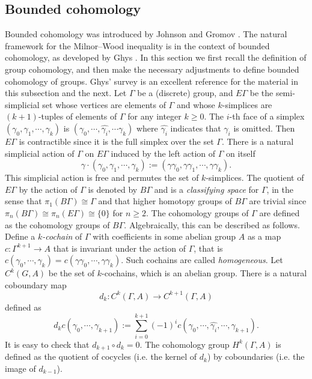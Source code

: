 \documentclass[11pt]{amsart}
\theoremstyle{remark}
\theoremstyle{definition}
\begin{document}
	\subsection{Bounded cohomology} Bounded cohomology was introduced by Johnson \cite{johnson1972cohomology} and Gromov \cite{gromov1982volume}. The natural framework for the Milnor--Wood inequality is in the context of bounded cohomology, as developed by Ghys \cite{ghys1987groupes}. In this section we first recall the definition of group cohomology, and then make the necessary adjustments to define bounded cohomology of groups. Ghys' survey \cite{ghys2001groups} is an excellent reference for the material in this subsection and the next. Let $\Gamma$ be a (discrete) group, and $E\Gamma$ be the semi-simplicial set whose vertices are elements of $\Gamma$ and whose $k$-simplices are $(k+1)$-tuples of elements of $\Gamma$ for any integer $k \geq 0$. The $i$-th face of a simplex $(\gamma_0 , \gamma_1 , \cdots, \gamma_k)$ is $(\gamma_0 , \cdots , \hat{\gamma_i}, \cdots \gamma_k)$ where $\hat{\gamma_i}$ indicates that $\gamma_i$ is omitted. Then $E \Gamma$ is contractible since it is the full simplex over the set $\Gamma$. There is a natural simplicial action of $\Gamma$ on $E \Gamma$ induced by the left action of $\Gamma$ on itself 
	\[ \gamma \cdot (\gamma_0 , \gamma_1, \cdots , \gamma_k) := (\gamma \gamma_0 , \gamma \gamma_1, \cdots, \gamma \gamma_k). \]
	This simplicial action is free and permutes the set of $k$-simplices. The quotient of $E \Gamma $ by the action of $\Gamma$ is denoted by $B \Gamma$ and is a \emph{classifying space} for $\Gamma$, in the sense that $\pi_1(B \Gamma) \cong \Gamma$ and that higher homotopy groups of $B \Gamma$ are trivial since $\pi_n(B \Gamma) \cong \pi_n(E \Gamma) \cong \{ 0 \}$ for $n \geq 2$. The cohomology groups of $\Gamma$ are defined as the cohomology groups of $B \Gamma$. Algebraically, this can be described as follows. Define a \emph{$k$-cochain} of $\Gamma$ with coefficients in some abelian group $A$ as a map $c \colon \Gamma^{k+1} \rightarrow  A$ that is invariant under the action of $\Gamma$, that is  $c(\gamma_0 , \cdots, \gamma_k) = c(\gamma \gamma_0 , \cdots , \gamma \gamma_k)$. Such cochains are called \emph{homogeneous}. Let $C^k(G , A)$ be the set of $k$-cochains, which is an abelian group. There is a natural coboundary map 
	\[ d_k \colon C^k(\Gamma , A) \rightarrow C^{k+1}(\Gamma , A) \] 
	defined as 
	\[ d_k c (\gamma_0 , \cdots, \gamma_{k+1}):= \sum_{i=0}^{k+1} (-1)^i c(\gamma_0 , \cdots, \hat{\gamma_i}, \cdots, \gamma_{k+1}).\]
	It is easy to check that $d_{k+1} \circ d_k = 0$. The cohomology group $H^k(\Gamma , A)$ is defined as the quotient of cocycles (i.e. the kernel of $d_{k}$) by coboundaries (i.e. the image of $d_{k-1}$). 
\end{document}
